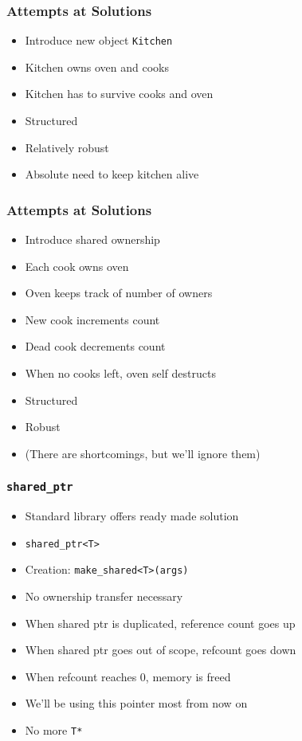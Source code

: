 \begin{frame}
  \frametitle{Attempts at Solutions}
  \begin{itemize}
    \item Introduce new object {\tt Kitchen}
    \item Kitchen owns oven and cooks
    \item Kitchen has to survive cooks and oven
  \end{itemize}
  \vskip5mm
  \begin{itemize}
    \item Structured
    \item Relatively robust
    \item Absolute need to keep kitchen alive
  \end{itemize}
\end{frame}

\begin{frame}
  \frametitle{Attempts at Solutions}
  \begin{itemize}
    \item Introduce shared ownership
    \item Each cook owns oven
    \item Oven keeps track of number of owners
    \item New cook increments count
    \item Dead cook decrements count
    \item When no cooks left, oven self destructs
  \end{itemize}
  \vskip5mm
  \begin{itemize}
    \item Structured
    \item Robust
    \item (There are shortcomings, but we'll ignore them)
  \end{itemize}
\end{frame}

\begin{frame}
  \frametitle{\tt shared\_ptr}
  \begin{itemize}
    \item Standard library offers ready made solution
    \item {\tt shared\_ptr<T>}
    \item Creation: {\tt make\_shared<T>(args)}
    \item No ownership transfer necessary
    \item When shared ptr is duplicated, reference count goes up
    \item When shared ptr goes out of scope, refcount goes down
    \item When refcount reaches 0, memory is freed
    \item We'll be using this pointer most from now on
    \item No more {\tt T*}
  \end{itemize}
\end{frame}

